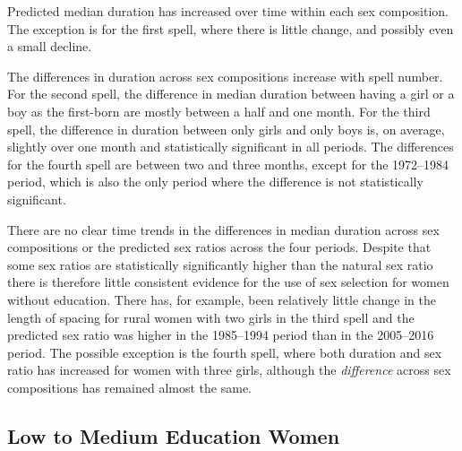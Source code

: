 \documentclass[12pt,letterpaper]{article}
\begin{document}
Predicted median duration has increased over time within
each sex composition.
The exception is for the first spell, where there is little
change, and possibly even a small decline.

The differences in duration across sex compositions increase with 
spell number.
For the second spell, the difference in median duration between
having a girl or a boy as the first-born are mostly between a half
and one month.
For the third spell, the difference in duration between only girls 
and only boys is, on average, slightly over one month and statistically 
significant in all periods.
The differences for the fourth spell are between two and three months, 
except for the 1972--1984 period, which is also the only period where 
the difference is not statistically significant.

There are no clear time trends in the differences in median duration
across sex compositions or the predicted sex ratios across the four periods.
Despite that some sex ratios are statistically significantly higher 
than the natural sex ratio there is therefore little consistent evidence 
for the use of sex selection for women without education.
There has, for example, been relatively little change in the length
of spacing for rural women with two girls in the third spell and 
the predicted sex ratio was higher in the 1985--1994 period
than in the 2005--2016 period.
The possible exception is the fourth spell, where both duration 
and sex ratio has increased for women with three girls, although
the \emph{difference} across sex compositions has remained almost
the same.

\subsection{Low to Medium Education Women}


\end{document}
